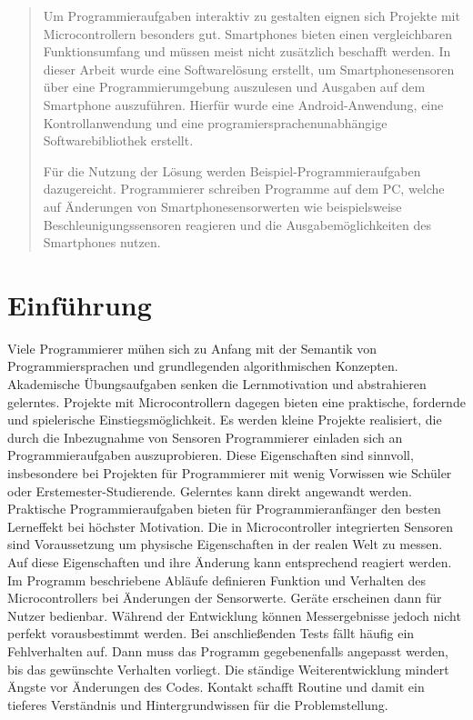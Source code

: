 \documentclass[11pt,a4paper]{report}
\begin{document}

\begin{abstract}
Um Programmieraufgaben interaktiv zu gestalten eignen sich Projekte mit Microcontrollern besonders gut.
Smartphones bieten einen vergleichbaren Funktionsumfang und müssen meist nicht zusätzlich beschafft werden.
In dieser Arbeit wurde eine Softwarelösung erstellt, um Smartphonesensoren über eine Programmierumgebung auszulesen und Ausgaben auf dem Smartphone auszuführen.
Hierfür wurde eine Android-Anwendung, eine Kontrollanwendung und eine programiersprachenunabhängige Softwarebibliothek erstellt.

Für die Nutzung der Lösung werden Beispiel-Programmieraufgaben dazugereicht.
Programmierer schreiben Programme auf dem PC, welche auf Änderungen von Smartphonesensorwerten wie beispielsweise Beschleunigungssensoren reagieren und die Ausgabemöglichkeiten des Smartphones nutzen.
\end{abstract}

\tableofcontents

\chapter{Einführung} \label{chap:intro}
Viele Programmierer mühen sich zu Anfang mit der Semantik von Programmiersprachen und grundlegenden algorithmischen Konzepten.
Akademische Übungsaufgaben senken die Lernmotivation und abstrahieren gelerntes.
Projekte mit Microcontrollern dagegen bieten eine praktische, fordernde und spielerische Einstiegsmöglichkeit.
Es werden kleine Projekte realisiert, die durch die Inbezugnahme von Sensoren Programmierer einladen sich an Programmieraufgaben auszuprobieren.
Diese Eigenschaften sind sinnvoll, insbesondere bei Projekten für Programmierer mit wenig Vorwissen wie Schüler oder Erstemester-Studierende.
Gelerntes kann direkt angewandt werden.
Praktische Programmieraufgaben bieten für Programmieranfänger den besten Lerneffekt bei höchster Motivation.\cite{learning_computer_programming}
Die in Microcontroller integrierten Sensoren sind Voraussetzung um physische Eigenschaften in der realen Welt zu messen.
Auf diese Eigenschaften und ihre Änderung kann entsprechend reagiert werden.
Im Programm beschriebene Abläufe definieren Funktion und Verhalten des Microcontrollers bei Änderungen der Sensorwerte.
Geräte erscheinen dann für Nutzer bedienbar.
Während der Entwicklung können Messergebnisse jedoch nicht perfekt vorausbestimmt werden.
Bei anschließenden Tests fällt häufig ein Fehlverhalten auf.
Dann muss das Programm gegebenenfalls angepasst werden, bis das gewünschte Verhalten vorliegt.
Die ständige Weiterentwicklung mindert Ängste vor Änderungen des Codes.
Kontakt schafft Routine und damit ein tieferes Verständnis und Hintergrundwissen für die Problemstellung.
\end{document}
